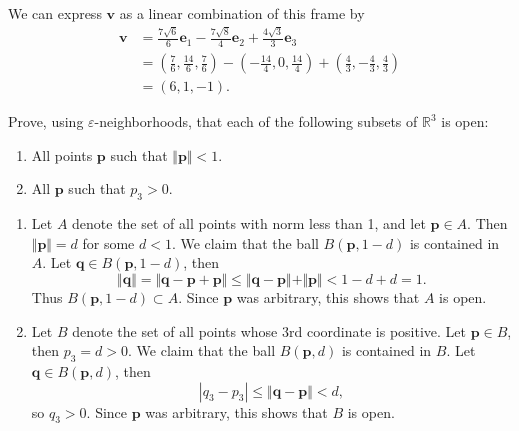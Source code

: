\documentclass[10pt]{report}
\begin{document}
We can express $\mathbf{v}$ as a linear combination of this frame by
\begin{align*}
	\mathbf{v} &= \frac{7 \sqrt{6} }{6} \mathbf{e}_1 - \frac{7\sqrt{8} }{4} \mathbf{e}_2 + \frac{4\sqrt{3} }{3} \mathbf{e}_3 \\
		   &= \left( \frac{7}{6} , \frac{14}{6} , \frac{7}{6}  \right)-\left( -\frac{14}{4} , 0, \frac{14}{4}  \right) + \left( \frac{4}{3} , -\frac{4}{3} , \frac{4}{3}  \right) \\
		   &= (6, 1, -1).
\end{align*}

\begin{exer}[2.1: 9]
	Prove, using $\varepsilon$-neighborhoods, that each of the following subsets of $\mathbb{R}^3$ is open:
	\begin{enumerate}
		\item All points $\mathbf{p}$ such that $\Vert{\mathbf{p}}\Vert<1$.
		\item All $\mathbf{p}$ such that $p_3>0$.
	\end{enumerate}
\end{exer}
\begin{enumerate}
	\item Let $A$ denote the set of all points with norm less than 1, and let $\mathbf{p} \in A$. Then $\Vert{\mathbf{p}}\Vert=d$ for some $d < 1$. We claim that the ball $B(\mathbf{p}, 1-d)$ is contained in $A$. Let $\mathbf{q} \in B(\mathbf{p}, 1-d)$, then
		\[
		\Vert{\mathbf{q}}\Vert= \Vert{\mathbf{q}-\mathbf{p}+\mathbf{p}}\Vert\leq \Vert{\mathbf{q}-\mathbf{p}}\Vert+\Vert{\mathbf{p}}\Vert < 1-d+d = 1.
	\] Thus $B(\mathbf{p}, 1-d) \subset A$. Since $\mathbf{p}$ was arbitrary, this shows that $A$ is open.

\item Let $B$ denote the set of all points whose 3rd coordinate is positive. Let $\mathbf{p} \in B$, then $p_3=d>0$. We claim that the ball $B(\mathbf{p},d)$ is contained in $B$. Let $\mathbf{q} \in B(\mathbf{p},d)$, then
	\[
	|q_3-p_3| \leq \Vert{\mathbf{q}-\mathbf{p}}\Vert<d,
\] so $q_3 > 0$. Since $\mathbf{p}$ was arbitrary, this shows that $B$ is open.
\end{enumerate}
\end{document}
